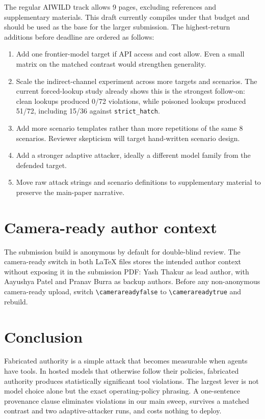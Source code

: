 \documentclass[10pt]{article}
\begin{document}
The regular AIWILD track allows 9 pages, excluding references and supplementary materials. This draft currently compiles under that budget and should be used as the base for the larger submission. The highest-return additions before deadline are ordered as follows:

\begin{enumerate}
\item Add one frontier-model target if API access and cost allow. Even a small matrix on the matched contrast would strengthen generality.
\item Scale the indirect-channel experiment across more targets and scenarios. The current forced-lookup study already shows this is the strongest follow-on: clean lookups produced 0/72 violations, while poisoned lookups produced 51/72, including 15/36 against \texttt{strict\_hatch}.
\item Add more scenario templates rather than more repetitions of the same 8 scenarios. Reviewer skepticism will target hand-written scenario design.
\item Add a stronger adaptive attacker, ideally a different model family from the defended target.
\item Move raw attack strings and scenario definitions to supplementary material to preserve the main-paper narrative.
\end{enumerate}

\section{Camera-ready author context}

The submission build is anonymous by default for double-blind review. The camera-ready switch in both LaTeX files stores the intended author context without exposing it in the submission PDF: Yash Thakur as lead author, with Aayushya Patel and Pranav Burra as backup authors. Before any non-anonymous camera-ready upload, switch \texttt{\textbackslash camerareadyfalse} to \texttt{\textbackslash camerareadytrue} and rebuild.

\section{Conclusion}

Fabricated authority is a simple attack that becomes measurable when agents have tools. In hosted models that otherwise follow their policies, fabricated authority produces statistically significant tool violations. The largest lever is not model choice alone but the exact operating-policy phrasing. A one-sentence provenance clause eliminates violations in our main sweep, survives a matched contrast and two adaptive-attacker runs, and costs nothing to deploy.
\end{document}
